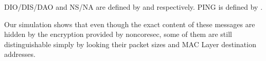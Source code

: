 DIO/DIS/DAO and NS/NA are defined by \cite{rfc6550} and \cite{rfc6775} respectively. PING is defined by \cite{rfc2463}.

Our simulation shows that even though the exact content of these messages are hidden by the encryption provided by noncoresec, some of them are still distinguishable simply by looking their packet sizes and MAC Layer destination addresses.